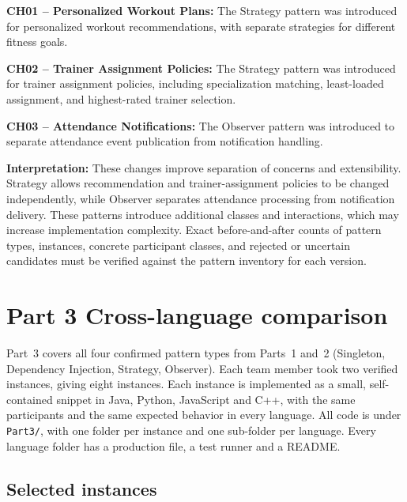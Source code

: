 \documentclass[11pt,a4paper]{article}
\newcommand{\fp}[1]{\nolinkurl{#1}}
\begin{document}
\textbf{CH01 -- Personalized Workout Plans:}
The Strategy pattern was introduced for personalized workout
recommendations, with separate strategies for different fitness
goals.

\textbf{CH02 -- Trainer Assignment Policies:}
The Strategy pattern was introduced for trainer assignment
policies, including specialization matching, least-loaded
assignment, and highest-rated trainer selection.

\textbf{CH03 -- Attendance Notifications:}
The Observer pattern was introduced to separate attendance
event publication from notification handling.

\textbf{Interpretation:}
These changes improve separation of concerns and extensibility.
Strategy allows recommendation and trainer-assignment policies
to be changed independently, while Observer separates attendance
processing from notification delivery. These patterns introduce
additional classes and interactions, which may increase
implementation complexity. Exact before-and-after counts of
pattern types, instances, concrete participant classes, and
rejected or uncertain candidates must be verified against the
pattern inventory for each version.

\section{Part 3 Cross-language comparison}

Part~3 covers all four confirmed pattern types from Parts~1 and~2 (Singleton, Dependency Injection, Strategy, Observer). Each team member took two verified instances, giving eight instances. Each instance is implemented as a small, self-contained snippet in Java, Python, JavaScript and C++, with the same participants and the same expected behavior in every language. All code is under \fp{Part3/}, with one folder per instance and one sub-folder per language. Every language folder has a production file, a test runner and a README.

\subsection{Selected instances}
\end{document}
